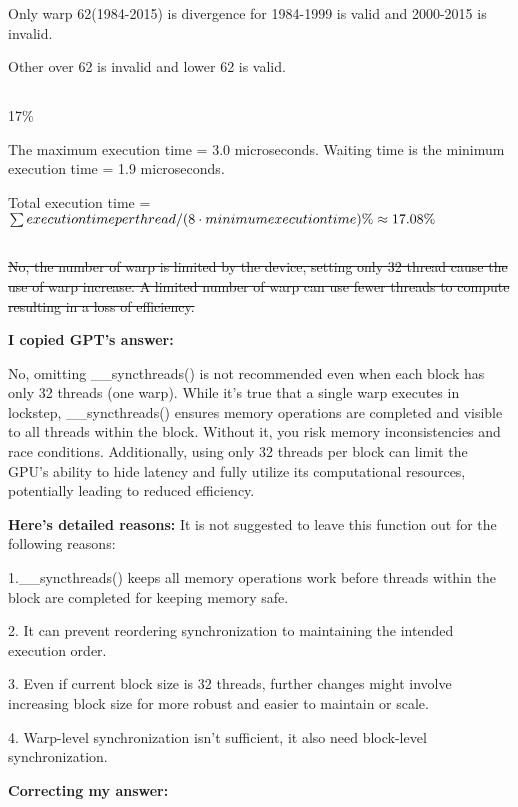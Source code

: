\documentclass{article}
\begin{document}
Only warp 62(1984-2015) is divergence for 1984-1999 is valid and 2000-2015 is invalid.

Other over 62 is invalid and lower 62 is valid.

\subsection{}
17\%

The maximum execution time = 3.0 microseconds. Waiting time is the minimum execution time = 1.9 microseconds.

Total execution time = \(\sum{execution time per thread}/(8\cdot minimum execution time) \time 100\% \approx 17.08\%\)

\subsection{}
\sout{No, the number of warp is limited by the device, setting only 32 thread cause the use of warp increase. A limited number of warp can use fewer threads to compute resulting in a loss of efficiency.}

\textbf{I copied GPT's answer:}

No, omitting \_\_syncthreads() is not recommended even when each block has only 32 threads (one warp). While it's true that a single warp executes in lockstep, \_\_syncthreads() ensures memory operations are completed and visible to all threads within the block. Without it, you risk memory inconsistencies and race conditions. Additionally, using only 32 threads per block can limit the GPU's ability to hide latency and fully utilize its computational resources, potentially leading to reduced efficiency.

\textbf{Here's detailed reasons:}
It is not suggested to leave this function out for the following reasons:

1.\_\_syncthreads() keeps all memory operations work before threads within the block are completed for keeping memory safe.

2. It can prevent reordering synchronization to maintaining the intended execution order.

3. Even if current block size is 32 threads, further changes might involve increasing block size for more robust and easier to maintain or scale.

4. Warp-level synchronization isn't sufficient, it also need block-level synchronization.

\textbf{Correcting my answer:}
\end{document}
